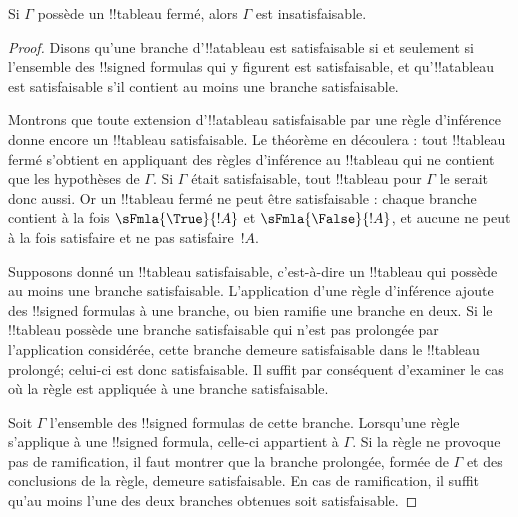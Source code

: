 \documentclass[../../../include/open-logic-section]{subfiles}
\begin{document}
\begin{thm}[Correction]
  Si $\Gamma$ possède un !!{tableau} fermé, alors $\Gamma$ est
  insatisfaisable.
\end{thm}

\begin{proof}
Disons qu'une branche d'!!a{tableau} est satisfaisable si et seulement
si l'ensemble des !!{signed formula}s qui y figurent est satisfaisable,
et qu'!!a{tableau} est satisfaisable s'il contient au moins une branche
satisfaisable.

Montrons que toute extension d'!!a{tableau} satisfaisable par une règle
d'inférence donne encore un !!{tableau} satisfaisable. Le théorème en
découlera : tout !!{tableau} fermé s'obtient en appliquant des règles
d'inférence au !!{tableau} qui ne contient que les hypothèses de
$\Gamma$. Si $\Gamma$ était satisfaisable, tout !!{tableau} pour
$\Gamma$ le serait donc aussi. Or un !!{tableau} fermé ne peut être
satisfaisable : chaque branche contient à la fois
$\sFmla{\True}{!A}$ et $\sFmla{\False}{!A}$, et aucune
 ne peut à la fois satisfaire et ne
pas satisfaire~$!A$.

Supposons donné un !!{tableau} satisfaisable, c'est-à-dire un
!!{tableau} qui possède au moins une branche satisfaisable. L'application
d'une règle d'inférence ajoute des !!{signed formula}s à une branche,
ou bien ramifie une branche en deux. Si le !!{tableau} possède une
branche satisfaisable qui n'est pas prolongée par l'application
considérée, cette branche demeure satisfaisable dans le !!{tableau}
prolongé; celui-ci est donc satisfaisable. Il suffit par conséquent
d'examiner le cas où la règle est appliquée à une branche satisfaisable.

Soit $\Gamma$ l'ensemble des !!{signed formula}s de cette branche.
Lorsqu'une règle s'applique à une !!{signed formula}, celle-ci
appartient à $\Gamma$. Si la règle ne provoque pas de ramification,
il faut montrer que la branche prolongée, formée de $\Gamma$ et des
conclusions de la règle, demeure satisfaisable. En cas de
ramification, il suffit qu'au moins l'une des deux branches
obtenues soit satisfaisable.
  

\end{proof}
\end{document}
